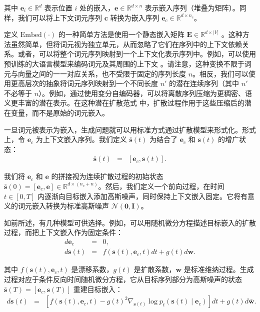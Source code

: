 \noindent 其中 $\mathbf{e}_i \in \mathbb{R}^d$ 表示位置 $i$ 处的嵌入，$\mathbf{e} \in \mathbb{R}^{d \times n}$ 表示嵌入序列（堆叠为矩阵）。同样，我们可以将上下文词元序列 $\mathbf{c}$ 转换为嵌入序列 $\mathbf{e}_{c} \in \mathbb{R}^{d \times n_c}$。

定义 $\mathrm{Embed}(\cdot)$ 的一种简单方法是使用一个静态嵌入矩阵 $\mathbf{E} \in \mathbb{R}^{d \times |V|}$ \citep{mikolov-etal:2013efficient,mikolov-etal:2013distributed}。这种方法虽然简单，但将词元视为独立单元，从而忽略了它们在序列中的上下文依赖关系。或者，可以将整个词元序列映射到一个上下文化表示序列中。例如，可以使用预训练的大语言模型来编码词元及其周围的上下文 \citep{devlin-etal:2019bert,brown-etal:2020language}。请注意，这种变换不限于词元与向量之间的一一对应关系，也不受限于固定的序列长度 $n$。相反，我们可以使用更高层次的抽象将词元序列映射到一个不同长度 $n'$ 的潜在连续序列（其中 $n'$ 不必等于 $n$）。例如，通过使用变分自编码器，可以将离散序列压缩为更稠密、语义更丰富的潜在表示。在这种潜在扩散范式 \citep{rombach-etal:2022high} 中，扩散过程作用于这些压缩后的潜在变量，而不是原始的词元嵌入。

一旦词元被表示为嵌入，生成问题就可以用标准方式通过扩散模型来形式化。形式上，令 $\mathbf{e}_c$ 为上下文嵌入序列。我们定义 $\bar{\mathbf{s}}(t)$ 为结合了 $\mathbf{e}_c$ 和 $\mathbf{s}(t)$ 的增广状态：
\begin{eqnarray}
\bar{\mathbf{s}}(t) & = & [\mathbf{e}_c, \mathbf{s}(t)].
\end{eqnarray}

我们将 $\mathbf{e}_c$ 和 $\mathbf{e}$ 的拼接视为连续扩散过程的初始状态 $\bar{\mathbf{s}}(0) = [\mathbf{e}_c,\mathbf{e}] \in \mathbb{R}^{d \times (n_c + n)}$。然后，我们定义一个前向过程，在时间 $t \in [0, T]$ 内逐渐向目标嵌入添加高斯噪声，同时保持上下文嵌入固定。它将有意义的词元嵌入转换为标准高斯噪声 $\mathcal{N}(\mathbf{0}, \mathbf{I})$。

如前所述，有几种模型可供选择。例如，可以用随机微分方程描述目标嵌入的扩散过程，而把上下文嵌入作为固定条件：
\begin{eqnarray}
d\mathbf{e}_c & = & 0, \nonumber\\
d \mathbf{s}(t) & = & f(\mathbf{s}(t),\mathbf{e}_c,t) d t + g(t) d\mathbf{w}.
\label{eq:diffusion-embedding}\label{eq:diffusion-embedding-nobar}
\end{eqnarray}

\noindent 其中 $f(\mathbf{s}(t),\mathbf{e}_c,t)$ 是漂移系数，$g(t)$ 是扩散系数，$\mathbf{w}$ 是标准维纳过程。生成过程对应于条件反向时间随机微分方程，它从目标序列部分为高斯噪声的状态 $\bar{\mathbf{s}}(T)=[\mathbf{e}_c,\mathbf{s}(T)]$ 重建目标嵌入：
\begin{eqnarray}
d \mathbf{s}(t) & = & \left[f(\mathbf{s}(t),\mathbf{e}_c,t)-g(t)^2\nabla_{\mathbf{s}(t)}
\log p_t(\mathbf{s}(t)\mid\mathbf{e}_c)\right]dt+g(t)d\bar{\mathbf{w}}.
\label{eq:generation-embedding}\label{eq:generation-embedding-nobar}
\end{eqnarray}

